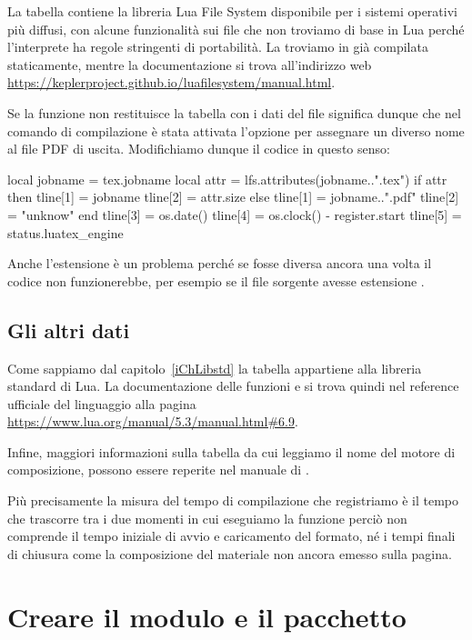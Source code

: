 La tabella  contiene la libreria Lua File System disponibile per i
sistemi operativi più diffusi, con alcune funzionalità sui file che non troviamo
di base in Lua perché l'interprete ha regole stringenti di portabilità. La
troviamo in \LuaTeX{} già compilata staticamente, mentre la documentazione
si trova all'indirizzo web
\url{https://keplerproject.github.io/luafilesystem/manual.html}.

Se la funzione  non restituisce la tabella con i dati del
file significa dunque che nel comando di compilazione è stata attivata l'opzione
 per assegnare un diverso nome al file PDF di uscita.
Modifichiamo dunque il codice in questo senso:
\begin{lines}
local jobname = tex.jobname
local attr = lfs.attributes(jobname..".tex")
if attr then
    tline[1] = jobname
    tline[2] = attr.size
else
    tline[1] = jobname..".pdf"
    tline[2] = "unknow"    
end
tline[3] = os.date()
tline[4] = os.clock() - register.start
tline[5] = status.luatex_engine
\end{lines}

Anche l'estensione  è un problema perché se fosse diversa ancora una
volta il codice non funzionerebbe, per esempio se il file sorgente avesse
estensione .


\subsection{Gli altri dati}

Come sappiamo dal capitolo~\ref{iChLibstd} la tabella  appartiene alla
libreria standard di Lua. La documentazione delle funzioni  e
 si trova quindi nel reference ufficiale del linguaggio alla pagina
\url{https://www.lua.org/manual/5.3/manual.html#6.9}.

Infine, maggiori informazioni sulla tabella  da cui leggiamo il nome
del motore di composizione, possono essere reperite nel manuale di \LuaTeX{}.

Più precisamente la misura del tempo di compilazione che registriamo è il tempo
che trascorre tra i due momenti in cui eseguiamo la funzione 
perciò non comprende il tempo iniziale di avvio e caricamento del formato, né i
tempi finali di chiusura come la composizione del materiale non ancora emesso
sulla pagina.


\section{Creare il modulo e il pacchetto}


